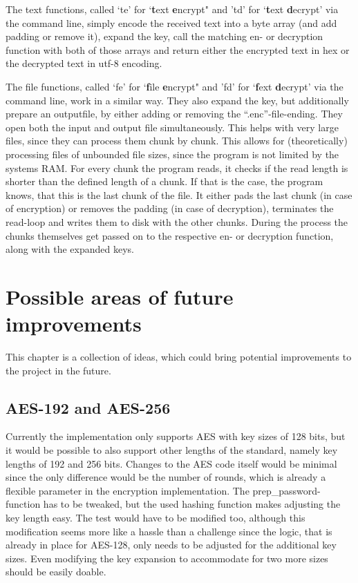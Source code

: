 The text functions, called `te' for `\textbf{t}ext \textbf{e}ncrypt" and
'td' for `\textbf{t}ext \textbf{d}ecrypt' via the command line, simply
encode the received text into a byte array (and add padding or remove
it), expand the key, call the matching en- or decryption function with
both of those arrays and return either the encrypted text in hex or the
decrypted text in utf-8 encoding.

The file functions, called `fe' for `\textbf{f}ile \textbf{e}ncrypt" and
'fd' for `\textbf{f}ext \textbf{d}ecrypt' via the command line, work in
a similar way. They also expand the key, but additionally prepare an
outputfile, by either adding or removing the ``.enc''-file-ending. They
open both the input and output file simultaneously. This helps with very
large files, since they can process them chunk by chunk. This allows for
(theoretically) processing files of unbounded file sizes, since the
program is not limited by the systems RAM. For every chunk the program
reads, it checks if the read length is shorter than the defined length
of a chunk. If that is the case, the program knows, that this is the
last chunk of the file. It either pads the last chunk (in case of
encryption) or removes the padding (in case of decryption), terminates
the read-loop and writes them to disk with the other chunks. During the
process the chunks themselves get passed on to the respective en- or
decryption function, along with the expanded keys.

\hypertarget{possible-areas-of-future-improvements}{%
\section{Possible areas of future
improvements}\label{possible-areas-of-future-improvements}}

This chapter is a collection of ideas, which could bring potential
improvements to the project in the future.

\hypertarget{aes-192-and-aes-256}{%
\subsection{AES-192 and AES-256}\label{aes-192-and-aes-256}}

Currently the implementation only supports AES with key sizes of 128
bits, but it would be possible to also support other lengths of the
standard, namely key lengths of 192 and 256 bits. Changes to the AES
code itself would be minimal since the only difference would be the
number of rounds, which is already a flexible parameter in the
encryption implementation. The prep\_password-function has to be
tweaked, but the used hashing function makes adjusting the key length
easy. The test would have to be modified too, although this modification
seems more like a hassle than a challenge since the logic, that is
already in place for AES-128, only needs to be adjusted for the
additional key sizes. Even modifying the key expansion to accommodate
for two more sizes should be easily doable.

